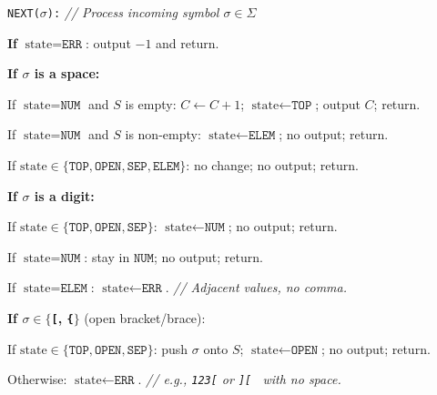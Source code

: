 \documentclass[11pt]{article}
\begin{document}
\noindent\texttt{NEXT($\sigma$):} \quad \textit{// Process incoming symbol $\sigma \in \Sigma$}

\begin{compactenum}

\item \textbf{If} $\text{state} = \texttt{ERR}$: output $-1$ and return.

\item \textbf{If $\sigma$ is a space:}
  \begin{compactitem}
  \item If $\text{state} = \texttt{NUM}$ and $S$ is empty: $C \leftarrow C+1$; $\text{state} \leftarrow \texttt{TOP}$; output $C$; return.
  \item If $\text{state} = \texttt{NUM}$ and $S$ is non-empty: $\text{state} \leftarrow \texttt{ELEM}$; no output; return.
  \item If $\text{state} \in \{\texttt{TOP}, \texttt{OPEN}, \texttt{SEP}, \texttt{ELEM}\}$: no change; no output; return.
  \end{compactitem}

\item \textbf{If $\sigma$ is a digit:}
  \begin{compactitem}
  \item If $\text{state} \in \{\texttt{TOP}, \texttt{OPEN}, \texttt{SEP}\}$: $\text{state} \leftarrow \texttt{NUM}$; no output; return.
  \item If $\text{state} = \texttt{NUM}$: stay in $\texttt{NUM}$; no output; return.
  \item If $\text{state} = \texttt{ELEM}$: $\text{state} \leftarrow \texttt{ERR}$. \quad \textit{// Adjacent values, no comma.}
  \end{compactitem}

\item \textbf{If $\sigma \in \{$\texttt{[}, \texttt{\{}$\}$} (open bracket/brace):
  \begin{compactitem}
  \item If $\text{state} \in \{\texttt{TOP}, \texttt{OPEN}, \texttt{SEP}\}$: push $\sigma$ onto $S$; $\text{state} \leftarrow \texttt{OPEN}$; no output; return.
  \item Otherwise: $\text{state} \leftarrow \texttt{ERR}$. \quad \textit{// e.g., \texttt{123[} or \texttt{][ } with no space.}
  \end{compactitem}


\end{compactenum}
\end{document}
